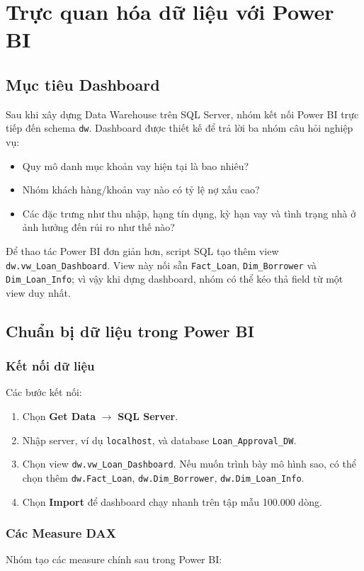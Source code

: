 \section{Trực quan hóa dữ liệu với Power BI}

\subsection{Mục tiêu Dashboard}
Sau khi xây dựng Data Warehouse trên SQL Server, nhóm kết nối Power BI trực tiếp đến schema \texttt{dw}. Dashboard được thiết kế để trả lời ba nhóm câu hỏi nghiệp vụ:
\begin{itemize}
    \item Quy mô danh mục khoản vay hiện tại là bao nhiêu?
    \item Nhóm khách hàng/khoản vay nào có tỷ lệ nợ xấu cao?
    \item Các đặc trưng như thu nhập, hạng tín dụng, kỳ hạn vay và tình trạng nhà ở ảnh hưởng đến rủi ro như thế nào?
\end{itemize}

Để thao tác Power BI đơn giản hơn, script SQL tạo thêm view \texttt{dw.vw\_Loan\_Dashboard}. View này nối sẵn \texttt{Fact\_Loan}, \texttt{Dim\_Borrower} và \texttt{Dim\_Loan\_Info}; vì vậy khi dựng dashboard, nhóm có thể kéo thả field từ một view duy nhất.

\subsection{Chuẩn bị dữ liệu trong Power BI}
\subsubsection{Kết nối dữ liệu}
Các bước kết nối:
\begin{enumerate}
    \item Chọn \textbf{Get Data} $\rightarrow$ \textbf{SQL Server}.
    \item Nhập server, ví dụ \texttt{localhost}, và database \texttt{Loan\_Approval\_DW}.
    \item Chọn view \texttt{dw.vw\_Loan\_Dashboard}. Nếu muốn trình bày mô hình sao, có thể chọn thêm \texttt{dw.Fact\_Loan}, \texttt{dw.Dim\_Borrower}, \texttt{dw.Dim\_Loan\_Info}.
    \item Chọn \textbf{Import} để dashboard chạy nhanh trên tập mẫu 100.000 dòng.
\end{enumerate}

\subsubsection{Các Measure DAX}
Nhóm tạo các measure chính sau trong Power BI:

